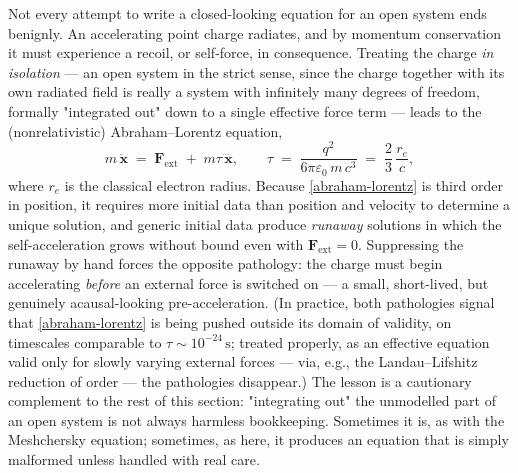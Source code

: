 Not every attempt to write a closed-looking equation for an open
system ends benignly. An accelerating point charge radiates, and by
momentum conservation it must experience a recoil, or self-force, in
consequence. Treating the charge \emph{in isolation} --- an open
system in the strict sense, since the charge together with its own
radiated field is really a system with infinitely many degrees of
freedom, formally "integrated out" down to a single effective force
term --- leads to the (nonrelativistic) Abraham--Lorentz equation,
\begin{equation}
  m\,\ddot{\mathbf x} \;=\; \mathbf F_{\mathrm{ext}} \;+\;
  m\tau\,\dddot{\mathbf x} ,
  \qquad
  \tau \;=\; \frac{q^2}{6\pi\varepsilon_0\,m\,c^3}
  \;=\; \frac{2}{3}\,\frac{r_e}{c},
  \label{abraham-lorentz}
\end{equation}
where $r_e$ is the classical electron radius. Because
\eqref{abraham-lorentz} is third order in position, it requires
more initial data than position and velocity to determine a unique
solution, and generic initial data produce \emph{runaway} solutions
in which the self-acceleration grows without bound even with
$\mathbf F_{\mathrm{ext}}=0$. Suppressing the runaway by hand forces
the opposite pathology: the charge must begin accelerating
\emph{before} an external force is switched on --- a small, short-lived,
but genuinely acausal-looking pre-acceleration. (In practice, both
pathologies signal that \eqref{abraham-lorentz} is being pushed
outside its domain of validity, on timescales comparable to $\tau
\sim 10^{-24}\,\mathrm s$; treated properly, as an effective equation
valid only for slowly varying external forces --- via, e.g., the
Landau--Lifshitz reduction of order --- the pathologies disappear.)
The lesson is a cautionary complement to the rest of this section:
"integrating out" the unmodelled part of an open system is not
always harmless bookkeeping. Sometimes it is, as with the Meshchersky
equation; sometimes, as here, it produces an equation that is simply
malformed unless handled with real care.

